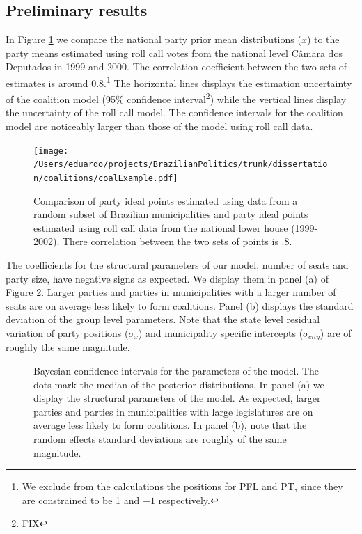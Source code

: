 \subsection{Preliminary results}

In Figure \ref{fig:mu} we compare the national party prior mean distributions ($\bar x$) to the party means estimated using roll call votes from the national level Câmara dos Deputados in 1999 and 2000.    The correlation coefficient between the two sets of estimates is around $0.8$.\footnote{We exclude from the calculations the positions for PFL and PT, since they are constrained to be 1 and $-1$ respectively.} The horizontal lines displays the estimation uncertainty of the coalition model (95\% confidence interval\footnote{FIX}) while the vertical lines  display the uncertainty of the roll call model. The confidence intervals for the coalition model are noticeably larger than those of the model using roll call data.   


\begin{figure}
  \centering
  \texttt{[image: /Users/eduardo/projects/BrazilianPolitics/trunk/dissertation/coalitions/coalExample.pdf]}
  \caption{Comparison of party ideal points estimated using data from a random subset of Brazilian municipalities and party ideal points estimated using roll call data from the national lower house (1999-2002). There correlation between the two sets of points is $.8$.}
  \label{fig:mu}
\end{figure}


The coefficients for the structural parameters of our model, number of seats and party size, have negative signs as expected. We display them in panel (a) of  Figure \ref{fig:coefs}. Larger parties and parties in municipalities with a larger number of seats are on average less likely to form coalitions.  Panel (b) displays the standard deviation of the group level parameters. Note that the state level residual variation of party positions ($\sigma_x$) and municipality specific intercepts ($\sigma_{city}$)  are of roughly the same magnitude.   


\begin{figure}
  \caption{Bayesian confidence intervals for the parameters of the model. The dots mark the median of the posterior distributions. In panel (a) we display the structural parameters of the model. As expected, larger parties and parties in municipalities with large legislatures are on average less likely to form coalitions. In panel (b), note that the random effects standard deviations are roughly of the same magnitude.  }
  \label{fig:coefs}
  \end{figure}  


